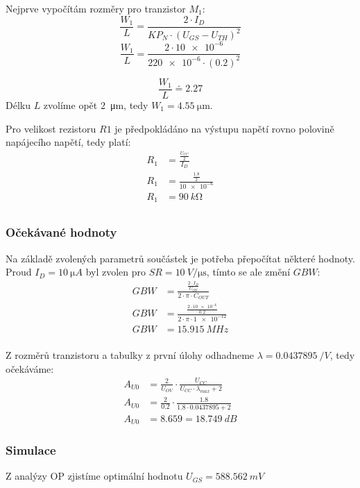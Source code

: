 Nejprve vypočítám rozměry pro tranzistor \(M_{1} \):
\[
    \frac{W_{1} }{L}=\frac{2\cdot I_{D}}{KP_{N}\cdot (U_{GS} -U_{TH})^2 } 
\]
\[
    \frac{W_{1} }{L}=\frac{2\cdot \num{10e-6}}{\num{220e-6}\cdot (\num{0.2})^2 } 
\]

\[
    \frac{W_{1} }{L}\doteq \num[round-mode=places,round-precision=2]{2.27} 
\]
Délku \(L\) zvolíme opět \qty{2}{\micro\meter}, tedy \(W_{1}= \qty{4.55}{\micro\meter}\).

Pro velikost rezistoru \(R1\) je předpokládáno na výstupu napětí rovno polovině napájecího napětí, tedy platí:
\begin{align*}
    R_{1}  &= \frac{\frac{U_{CC}}{2}}{I_{D} } \\
    R_{1}  &= \frac{\frac{\num{1.8}}{2}}{\num{10e-6} } \\
    R_{1}  &= \qty{90}{k\ohm} \\
\end{align*}



\subsubsection{Očekávané hodnoty}
    Na základě zvolených parametrů součástek je potřeba přepočítat některé hodnoty. Proud \(I_{D} = \qty{10}{\micro A}\) byl zvolen pro \(SR=\qty{10}{V\per\micro\second}\), tímto se ale změní \(GBW\):
    \begin{align*}
        GBW & =\frac{\frac{2 \cdot I_D}{U_{O V}}}{2 \cdot \pi \cdot C_{O U T}} \\
        GBW & =\frac{\frac{2 \cdot \num{10e-6}}{\num{0.2}}}{2 \cdot \pi \cdot \num{1e-12}} \\
        GBW & =\qty{15.915}{MHz} \\
    \end{align*}

    Z rozměrů tranzistoru a tabulky z první úlohy odhadneme \(\lambda=\qty{0.0437895}{\per V}\), tedy očekáváme:
    \begin{align*}
        A_{U 0} & =\frac{2}{U_{O V}} \cdot \frac{U_{C C}}{U_{C C} \cdot \lambda_{max} +2} \\
        A_{U 0} & =\frac{2}{\num{0.2}} \cdot \frac{\num{1.8}}{\num{1.8} \cdot \num{0.0437895} +2} \\
        A_{U 0} & = \num{8.659} = \qty{18.749}{dB}
    \end{align*}




\subsubsection{Simulace}
    Z analýzy OP zjistíme optimální hodnotu \(U_{GS} = \qty{588,562}{mV}\) 

